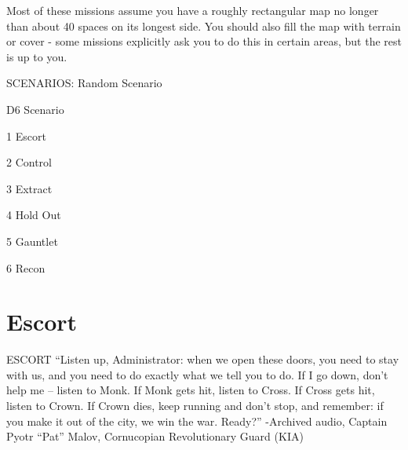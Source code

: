 Most of these missions assume you have a roughly rectangular map no longer than about 40  
spaces on its longest side. You should also fill the map with terrain or cover - some missions  
explicitly ask you to do this in certain areas, but the rest is up to you.  

                                                SCENARIOS:  
Random Scenario
 

 D6                                                     Scenario 

 1                                                      Escort 

 2                                                      Control 

 3                                                      Extract 

 4                                                      Hold Out 

 5                                                      Gauntlet 

 6                                                      Recon 


\section{Escort}                                          


                                                               ESCORT  
                                                               “Listen up, Administrator: when we open these  
                                                               doors, you need to stay with us, and you need to  
                                                               do exactly what we tell you to do. If I go down,  
                                                               don’t help me -- listen to Monk. If Monk gets hit,  
                                                               listen to Cross. If Cross gets hit, listen to Crown.  
                                                               If Crown dies, keep running and don’t stop, and  
                                                               remember: if you make it out of the city, we win  
                                                               the war. Ready?”   
                                                               -Archived audio, Captain Pyotr “Pat” Malov,  
                                                               Cornucopian Revolutionary Guard (KIA)  

